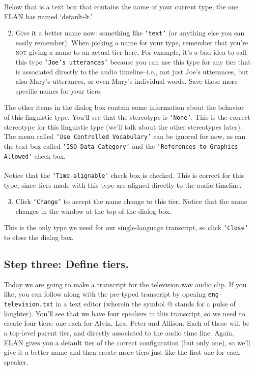 \documentclass[letterpaper,12pt]{article}
\begin{document}
\noindent Below that is a text box that contains the name of your current type, the one ELAN has named `default-lt.'
\begin{enumerate}
\setcounter{enumi}{1}
\item Give it a better name now: something like \texttt{`text'} (or anything else you can easily remember). When picking a name for your type, remember that you're \textsc{not} giving a name to an actual tier here. For example, it's a bad idea to call this type \texttt{`Joe's utterances'} because you can use this type for any tier that is associated directly to the audio timeline--i.e., not just Joe's utterances, but also Mary's utterances, or even Mary's individual words. Save those more specific names for your tiers.
\end{enumerate}
\noindent The other items in the dialog box contain some information about the behavior of this linguistic type. You'll see that the stereotype is \texttt{`None'}. This is the correct stereotype for this linguistic type (we'll talk about the other stereotypes later). The menu called \texttt{`Use Controlled Vocabulary'} can be ignored for now, as can the text box called \texttt{`ISO Data Category'} and the \texttt{`References to Graphics Allowed'} check box.\\
\\
\noindent Notice that the \texttt{`Time-alignable'} check box is checked. This is correct for this type, since tiers made with this type are aligned directly to the audio timeline.

\begin{enumerate}
\setcounter{enumi}{2}
\item Click \texttt{`Change'} to accept the name change to this tier. Notice that the name changes in the window at the top of the dialog box.
\end{enumerate}
\noindent This is the only type we need for our single-language transcript, so click \texttt{`Close'} to close the dialog box.

\subsection*{Step three: Define tiers.}

\noindent Today we are going to make a transcript for the television.wav audio clip. If you like, you can follow along with the pre-typed transcript by opening \texttt{eng-television.txt} in a text editor (wherein the symbol @ stands for a pulse of laughter). You'll see that we have four speakers in this transcript, so we need to create four tiers: one each for Alvin, Lea, Peter and Allison. Each of these will be a top-level parent tier, and directly associated to the audio time line. Again, ELAN gives you a default tier of the correct configuration (but only one), so we'll give it a better name and then create more tiers just like the first one for each speaker.
\end{document}
